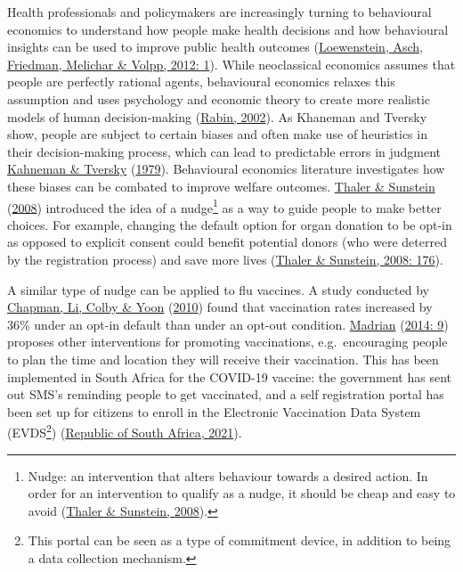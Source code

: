\documentclass[11pt,preprint, authoryear]{elsarticle}
\numberwithin{equation}{section}
\numberwithin{figure}{section}
\numberwithin{table}{section}
\let\rmarkdownfootnote\footnote%
\def\footnote{\protect\rmarkdownfootnote}
\begin{document}
Health professionals and policymakers are increasingly turning to
behavioural economics to understand how people make health decisions and
how behavioural insights can be used to improve public health outcomes
(\protect\hyperlink{ref-health}{Loewenstein, Asch, Friedman, Melichar \&
Volpp, 2012: 1}). While neoclassical economics assumes that people are
perfectly rational agents, behavioural economics relaxes this assumption
and uses psychology and economic theory to create more realistic models
of human decision-making (\protect\hyperlink{ref-rabin}{Rabin, 2002}).
As Khaneman and Tversky show, people are subject to certain biases and
often make use of heuristics in their decision-making process, which can
lead to predictable errors in judgment
\protect\hyperlink{ref-prospect}{Kahneman \& Tversky}
(\protect\hyperlink{ref-prospect}{1979}). Behavioural economics
literature investigates how these biases can be combated to improve
welfare outcomes. \protect\hyperlink{ref-nudge}{Thaler \& Sunstein}
(\protect\hyperlink{ref-nudge}{2008}) introduced the idea of a
nudge\footnote{Nudge: an intervention that alters behaviour towards a
  desired action. In order for an intervention to qualify as a nudge, it
  should be cheap and easy to avoid
  (\protect\hyperlink{ref-nudge}{Thaler \& Sunstein, 2008}).} as a way
to guide people to make better choices. For example, changing the
default option for organ donation to be opt-in as opposed to explicit
consent could benefit potential donors (who were deterred by the
registration process) and save more lives
(\protect\hyperlink{ref-nudge}{Thaler \& Sunstein, 2008: 176}).

A similar type of nudge can be applied to flu vaccines. A study
conducted by \protect\hyperlink{ref-opt}{Chapman, Li, Colby \& Yoon}
(\protect\hyperlink{ref-opt}{2010}) found that vaccination rates
increased by 36\% under an opt-in default than under an opt-out
condition. \protect\hyperlink{ref-flu}{Madrian}
(\protect\hyperlink{ref-flu}{2014: 9}) proposes other interventions for
promoting vaccinations, e.g.~encouraging people to plan the time and
location they will receive their vaccination. This has been implemented
in South Africa for the COVID-19 vaccine: the government has sent out
SMS's reminding people to get vaccinated, and a self registration portal
has been set up for citizens to enroll in the Electronic Vaccination
Data System (EVDS\footnote{This portal can be seen as a type of
  commitment device, in addition to being a data collection mechanism.})
(\protect\hyperlink{ref-evds}{Republic of South Africa, 2021}).
\end{document}
